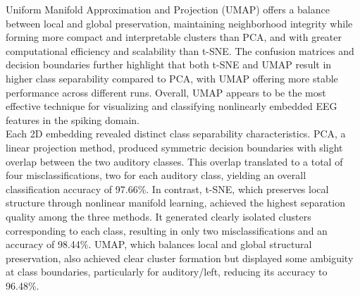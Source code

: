 \noindent Uniform Manifold Approximation and Projection (UMAP) offers a balance between local and global preservation, maintaining neighborhood integrity while forming more compact and interpretable clusters than PCA, and with greater computational efficiency and scalability than t-SNE. The confusion matrices and decision boundaries further highlight that both t-SNE and UMAP result in higher class separability compared to PCA, with UMAP offering more stable performance across different runs. Overall, UMAP appears to be the most effective technique for visualizing and classifying nonlinearly embedded EEG features in the spiking domain.\\

\noindent Each 2D embedding revealed distinct class separability characteristics. PCA, a linear projection method, produced symmetric decision boundaries with slight overlap between the two auditory classes. This overlap translated to a total of four misclassifications, two for each auditory class, yielding an overall classification accuracy of 97.66\%. In contrast, t-SNE, which preserves local structure through nonlinear manifold learning, achieved the highest separation quality among the three methods. It generated clearly isolated clusters corresponding to each class, resulting in only two misclassifications and an accuracy of 98.44\%. UMAP, which balances local and global structural preservation, also achieved clear cluster formation but displayed some ambiguity at class boundaries, particularly for auditory/left, reducing its accuracy to 96.48\%.
\begin{table}[ht]
    \centering
    \caption{Classification accuracy (\%) for each stimulus class using PCA, t-SNE, and UMAP embeddings followed by logistic regression.}
    \label{table:7b}
\end{table}

